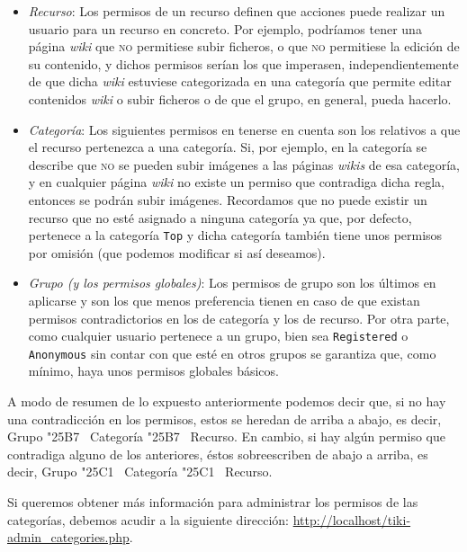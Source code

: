 \begin{itemize}
\item \textit{Recurso}: Los permisos de un recurso definen que acciones puede realizar un usuario para un recurso en concreto. Por ejemplo, podríamos tener una página \textit{wiki} que \textsc{no} permitiese subir ficheros, o que \textsc{no} permitiese la edición de su contenido, y dichos permisos serían los que imperasen, independientemente de que dicha \textit{wiki} estuviese categorizada en una categoría que permite editar contenidos \textit{wiki} o subir ficheros o de que el grupo, en general, pueda hacerlo.

 \item \textit{Categoría}: Los siguientes permisos en tenerse en cuenta son los relativos a que el recurso pertenezca a una categoría. Si, por ejemplo, en la categoría se describe que \textsc{no} se pueden subir imágenes a las páginas \textit{wikis} de esa categoría, y en cualquier página \textit{wiki} no existe un permiso que contradiga dicha regla, entonces se podrán subir imágenes. Recordamos que no puede existir un recurso que no esté asignado a ninguna categoría ya que, por defecto, pertenece a la categoría \texttt{Top} y dicha categoría también tiene unos permisos por omisión (que podemos modificar si así deseamos).

 \item \textit{Grupo (y los permisos globales)}: Los permisos de grupo son los últimos en aplicarse y son los que menos preferencia tienen en caso de que existan permisos contradictorios en los de categoría y los de recurso. Por otra parte, como cualquier usuario pertenece a un grupo, bien sea \texttt{Registered} o \texttt{Anonymous} sin contar con que esté en otros grupos se garantiza que, como mínimo, haya unos permisos globales básicos.  
\end{itemize}

A modo de resumen de lo expuesto anteriormente podemos decir que, si no hay una contradicción en los permisos, estos se heredan de arriba a abajo, es decir, Grupo \char"25B7~ Categoría \char"25B7~ Recurso. En cambio, si hay algún permiso que contradiga alguno de los anteriores, éstos sobreescriben de abajo a arriba, es decir, Grupo \char"25C1~ Categoría \char"25C1~ Recurso.

Si queremos obtener más información para administrar los permisos de las categorías, debemos acudir a la siguiente dirección: \url{http://localhost/tiki-admin_categories.php}.

